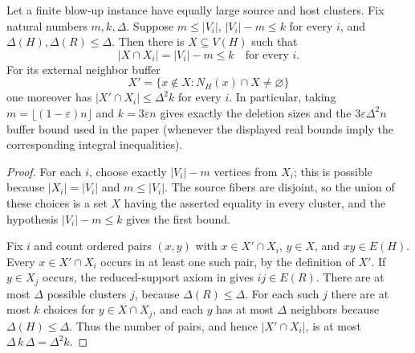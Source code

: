\begin{lemma}
Let a finite blow-up instance have equally large source and host clusters.  Fix natural numbers $m,k,\Delta$.  Suppose $m\leq |V_i|$, $|V_i|-m\leq k$ for every $i$, and $\Delta(H),\Delta(R)\leq\Delta$.  Then there is $X\subseteq V(H)$ such that
\[
 |X\cap X_i|=|V_i|-m\leq k\quad\text{for every }i.
\]
For its external neighbor buffer
\[
 X'=\{x\notin X:N_H(x)\cap X\ne\varnothing\}
\]
one moreover has $|X'\cap X_i|\leq\Delta^2k$ for every $i$.  In particular, taking $m=\lfloor(1-\varepsilon)n\rfloor$ and $k=3\varepsilon n$ gives exactly the deletion sizes and the $3\varepsilon\Delta^2n$ buffer bound used in the paper (whenever the displayed real bounds imply the corresponding integral inequalities).
\end{lemma}
\begin{proof}
For each $i$, choose exactly $|V_i|-m$ vertices from $X_i$; this is possible because $|X_i|=|V_i|$ and $m\leq|V_i|$.  The source fibers are disjoint, so the union of these choices is a set $X$ having the asserted equality in every cluster, and the hypothesis $|V_i|-m\leq k$ gives the first bound.

Fix $i$ and count ordered pairs $(x,y)$ with $x\in X'\cap X_i$, $y\in X$, and $xy\in E(H)$.  Every $x\in X'\cap X_i$ occurs in at least one such pair, by the definition of $X'$.  If $y\in X_j$ occurs, the reduced-support axiom in  gives $ij\in E(R)$.  There are at most $\Delta$ possible clusters $j$, because $\Delta(R)\leq\Delta$.  For each such $j$ there are at most $k$ choices for $y\in X\cap X_j$, and each $y$ has at most $\Delta$ neighbors because $\Delta(H)\leq\Delta$.  Thus the number of pairs, and hence $|X'\cap X_i|$, is at most $\Delta\,k\,\Delta=\Delta^2k$.
\end{proof}
